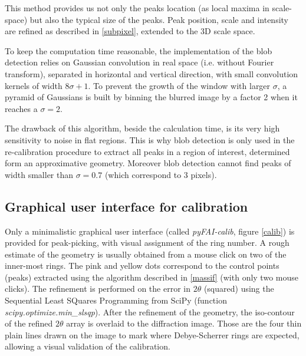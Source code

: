 \documentclass[preprint]{iucr}
\begin{document}
This method provides us not only the peaks location (as local maxima in
scale-space) but also the typical size of the peaks.
Peak position, scale and intensity are refined as described in
\ref{subpixel}, extended to the 3D scale space.

To keep the computation time reasonable, the implementation of the blob
detection relies on Gaussian convolution in real space (i.e. without Fourier
transform), separated in horizontal and vertical direction, with small
convolution kernels of width $8 \sigma +1$.
To prevent the growth of the window with larger $\sigma$, a pyramid of Gaussians
is built by binning the blurred image by a factor 2 when it reaches a
$\sigma=2$.

The drawback of this algorithm, beside the calculation time, is its very high
sensitivity to noise in flat regions.
This is why blob detection is only used in the re-calibration procedure to
extract all peaks in a region of interest, determined form an
approximative geometry.
Moreover blob detection cannot find peaks of width smaller than
$\sigma=0.7$ (which correspond to 3 pixels).


\subsection{Graphical user interface for calibration}
\label{gui_calib}
Only a minimalistic graphical user interface (called
\textit{pyFAI-calib}, figure \ref{calib}) is provided
for peak-picking, with visual assignment of the ring number.
A rough estimate of the geometry is usually obtained from a mouse click on
two of the inner-most rings.
The pink and yellow dots correspond to the control points (peaks) extracted
using the algorithm described in \ref{massif} (with only two mouse clicks).
The refinement is performed on the error in $2\theta$ (squared) using the
Sequential Least SQuares Programming  from
SciPy (function \textit{scipy.optimize.min\_slsqp}).
After the refinement of the geometry, the iso-contour of the refined $2\theta$ array is
overlaid to the diffraction image. Those are the four thin plain lines drawn on
the image to mark where Debye-Scherrer rings are expected, allowing a visual
validation of the calibration.
\end{document}

